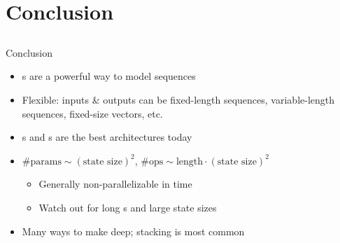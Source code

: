 \section{Conclusion}
\subsection{}

\begin{frame}{Conclusion}
    \begin{itemize}
        \item \rnn{}s are a powerful way to model sequences
        \item Flexible: inputs \& outputs can be fixed-length sequences, variable-length sequences, fixed-size vectors, etc.
        \item \lstm{}s and \gru{}s are the best architectures today
        \item $\# \text{params} \sim (\text{state size})^2$,
        $\# \text{ops} \sim \text{length} \cdot (\text{state size})^2$
        \begin{itemize}
            \item Generally non-parallelizable in time
            \item Watch out for long \rnn{}s and large state sizes
        \end{itemize}
        \item Many ways to make deep; stacking is most common
    \end{itemize}
\end{frame}

